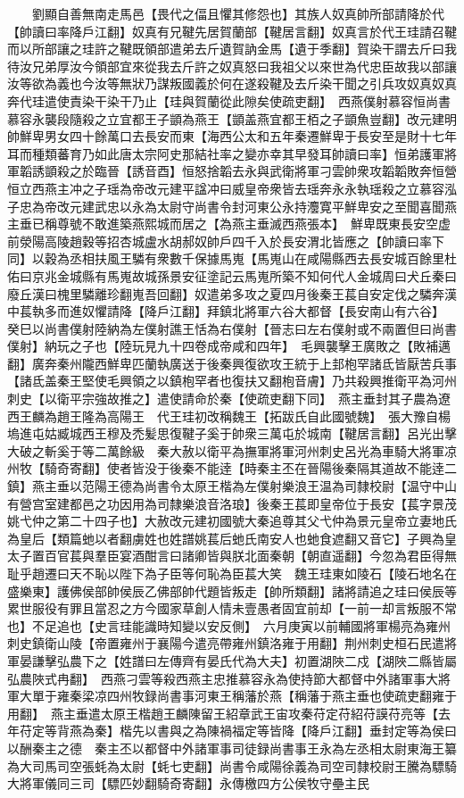 　　劉顯自善無南走馬邑【畏代之偪且懼其修怨也】其族人奴真帥所部請降於代【帥讀曰率降戶江翻】奴真有兄鞬先居賀蘭部【鞬居言翻】奴真言於代王珪請召鞬而以所部讓之珪許之鞬既領部遣弟去斤遺賀訥金馬【遺于季翻】賀染干謂去斤曰我待汝兄弟厚汝今領部宜來從我去斤許之奴真怒曰我祖父以來世為代忠臣故我以部讓汝等欲為義也今汝等無狀乃謀叛國義於何在遂殺鞬及去斤染干聞之引兵攻奴真奴真奔代珪遣使責染干染干乃止【珪與賀蘭從此隙矣使疏吏翻】　西燕僕射慕容恒尚書慕容永襲段隨殺之立宜都王子顗為燕王【顗盖燕宜都王栢之子顗魚豈翻】改元建明帥鮮卑男女四十餘萬口去長安而東【海西公太和五年秦遷鮮卑于長安至是財十七年耳而種類蕃育乃如此唐太宗阿史那結社率之變亦幸其早發耳帥讀曰率】恒弟護軍將軍韜誘顗殺之於臨晉【誘音酉】恒怒捨韜去永與武衛將軍刁雲帥衆攻韜韜敗奔恒營恒立西燕主冲之子瑶為帝改元建平諡冲曰威皇帝衆皆去瑶奔永永執瑶殺之立慕容泓子忠為帝改元建武忠以永為太尉守尚書令封河東公永持灋寛平鮮卑安之至聞喜聞燕主垂已稱尊號不敢進築燕熙城而居之【為燕主垂滅西燕張本】　鮮卑既東長安空虚前滎陽高陵趙穀等招杏城盧水胡郝奴帥戶四千入於長安渭北皆應之【帥讀曰率下同】以穀為丞相扶風王驎有衆數千保據馬嵬【馬嵬山在咸陽縣西去長安城百餘里杜佑曰京兆金城縣有馬嵬故城孫景安征塗記云馬嵬所築不知何代人金城周曰犬丘秦曰廢丘漢曰槐里驎離珍翻嵬吾回翻】奴遣弟多攻之夏四月後秦王萇自安定伐之驎奔漢中萇執多而進奴懼請降【降戶江翻】拜鎮北將軍六谷大都督【長安南山有六谷】　癸巳以尚書僕射陸納為左僕射譙王恬為右僕射【晉志曰左右僕射或不兩置但曰尚書僕射】納玩之子也【陸玩見九十四卷成帝咸和四年】　毛興襲擊王廣敗之【敗補邁翻】廣奔秦州隴西鮮卑匹蘭執廣送于後秦興復欲攻王統于上邽枹罕諸氐皆厭苦兵事【諸氐盖秦王堅使毛興領之以鎮枹罕者也復扶又翻枹音膚】乃共殺興推衛平為河州刺史【以衛平宗強故推之】遣使請命於秦【使疏吏翻下同】　燕主垂封其子農為遼西王麟為趙王隆為高陽王　代王珪初改稱魏王【拓跋氏自此國號魏】　張大豫自楊塢進屯姑臧城西王穆及禿髪思復鞬子奚于帥衆三萬屯於城南【鞬居言翻】呂光出擊大破之斬奚于等二萬餘級　秦大赦以衛平為撫軍將軍河州刺史呂光為車騎大將軍凉州牧【騎奇寄翻】使者皆没于後秦不能逹【時秦主丕在晉陽後秦隔其道故不能逹二鎮】燕主垂以范陽王德為尚書令太原王楷為左僕射樂浪王温為司隸校尉【温守中山有營宫室建都邑之功因用為司隸樂浪音洛琅】後秦王萇即皇帝位于長安【萇字景茂姚弋仲之第二十四子也】大赦改元建初國號大秦追尊其父弋仲為景元皇帝立妻地氏為皇后【類篇虵以者翻虜姓也姓譜姚萇后虵氏南安人也虵食遮翻又音它】子興為皇太子置百官萇與羣臣宴酒酣言曰諸卿皆與朕北面秦朝【朝直遥翻】今忽為君臣得無耻乎趙遷曰天不恥以陛下為子臣等何恥為臣萇大笑　魏王珪東如陵石【陵石地名在盛樂東】護佛侯部帥侯辰乙佛部帥代題皆叛走【帥所類翻】諸將請追之珪曰侯辰等累世服役有罪且當忍之方今國家草創人情未壹愚者固宜前却【一前一却言叛服不常也】不足追也【史言珪能識時知變以安反側】　六月庚寅以前輔國將軍楊亮為雍州刺史鎮衛山陵【帝置雍州于襄陽今遣亮帶雍州鎮洛雍于用翻】荆州刺史桓石民遣將軍晏謙擊弘農下之【姓譜曰左傳齊有晏氏代為大夫】初置湖陜二戍【湖陜二縣皆屬弘農陜式冉翻】　西燕刁雲等殺西燕主忠推慕容永為使持節大都督中外諸軍事大將軍大單于雍秦梁凉四州牧録尚書事河東王稱藩於燕【稱藩于燕主垂也使疏吏翻雍于用翻】　燕主垂遣太原王楷趙王麟陳留王紹章武王宙攻秦苻定苻紹苻謨苻亮等【去年苻定等背燕為秦】楷先以書與之為陳禍福定等皆降【降戶江翻】垂封定等為侯曰以酬秦主之德　秦主丕以都督中外諸軍事司徒録尚書事王永為左丞相太尉東海王纂為大司馬司空張蚝為太尉【蚝七吏翻】尚書令咸陽徐義為司空司隸校尉王騰為驃騎大將軍儀同三司【驃匹妙翻騎奇寄翻】永傳檄四方公侯牧守壘主民